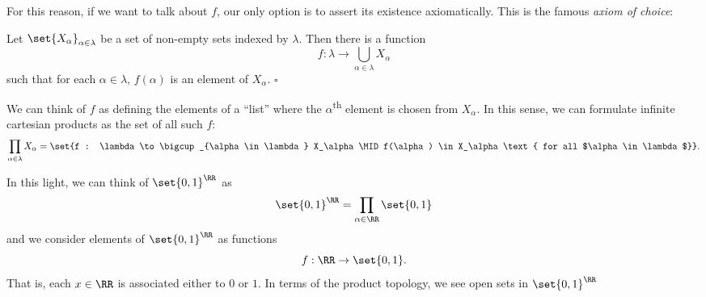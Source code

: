 \documentclass{fkpset}
\begin{document}
\begin{solution}
\begin{leftbar}
\begin{note}
        {\color{Magenta}
          For this reason, if we want to talk about $f$, our only
          option is to assert its existence axiomatically. This is the
          famous \emph{axiom of choice}:
          \begin{axiom}[Choice]
            Let $\set{X_\alpha}_{\alpha \in \lambda}$ be a set of
            non-empty sets indexed by $\lambda$. Then there is a
            function
            \[
              f : \lambda \to \bigcup_{\alpha \in \lambda} X_\alpha
            \]
            such that for each $\alpha \in \lambda$, $f(\alpha)$ is an
            element of $X_\alpha$. \hfill $\square$
          \end{axiom}
          We can think of $f$ as defining the elements of a ``list''
          where the $\alpha$\textsuperscript{th} element is chosen
          from $X_\alpha$. In this sense, we can formulate infinite
          cartesian products as the set of all such $f$:
          \[
            \prod_{\alpha \in \lambda} X_\alpha = \set{f : \lambda \to
              \bigcup_{\alpha \in \lambda} X_\alpha \MID f(\alpha) \in
            X_\alpha \text{ for all $\alpha \in \lambda$}}.
          \]
        }
      \end{note}
      In this light, we can think of $\set{0,1}^\RR$ as
      \[
        \set{0,1}^\RR = \prod_{\alpha \in \RR} \set{0,1}
      \]
      and we consider elements of $\set{0,1}^\RR$ as functions
      \[
        f : \RR \to \set{0,1}.
      \]
      That is, each $x \in \RR$ is associated either to $0$ or $1$.
      In terms of the product topology, we see open sets in
      $\set{0,1}^\RR$
    \end{leftbar}





  \end{solution}
  \clearpage
\end{document}
